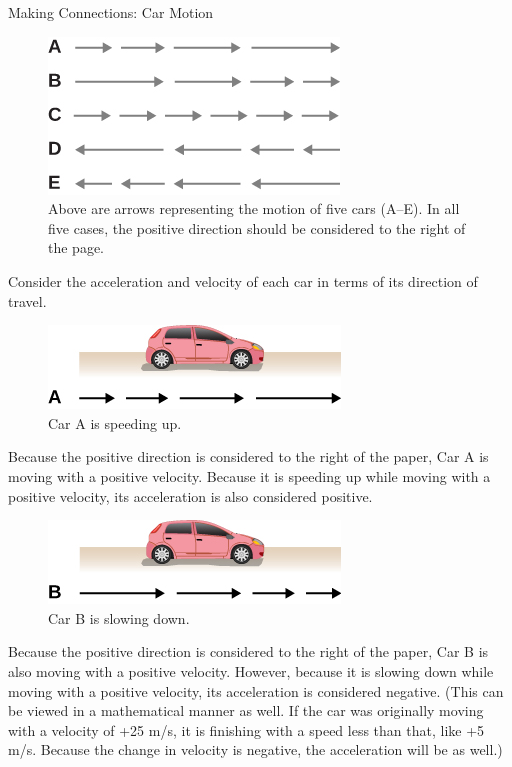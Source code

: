\documentclass[
]{book}
\newenvironment{note}{}{}
\begin{document}
\hypertarget{fs-id1389422}{}
\begin{note}

Making Connections: Car Motion

\begin{figure}
\hypertarget{import-auto-id3579626}{%
\centering
\includegraphics{images/Figure_Ch2_M4_01.jpg}
\caption{Above are arrows representing the motion of five cars (A--E). In all
five cases, the positive direction should be considered to the right of
the page.}\label{import-auto-id3579626}
}
\end{figure}

Consider the acceleration and velocity of each car in terms of its
direction of travel.

\begin{figure}
\hypertarget{fs-id2218162}{%
\centering
\includegraphics{images/Figure_Ch2_M4_02.jpg}
\caption{Car A is speeding up.}\label{fs-id2218162}
}
\end{figure}

Because the positive direction is considered to the right of the paper,
Car A is moving with a positive velocity. Because it is speeding up
while moving with a positive velocity, its acceleration is also
considered positive.

\begin{figure}
\hypertarget{fs-id3242689}{%
\centering
\includegraphics{images/Figure_Ch2_M4_03.jpg}
\caption{Car B is slowing down.}\label{fs-id3242689}
}
\end{figure}

Because the positive direction is considered to the right of the paper,
Car B is also moving with a positive velocity. However, because it is
slowing down while moving with a positive velocity, its acceleration is
considered negative. (This can be viewed in a mathematical manner as
well. If the car was originally moving with a velocity of +25 m/s, it is
finishing with a speed less than that, like +5 m/s. Because the change
in velocity is negative, the acceleration will be as well.)


\end{note}
\end{document}
